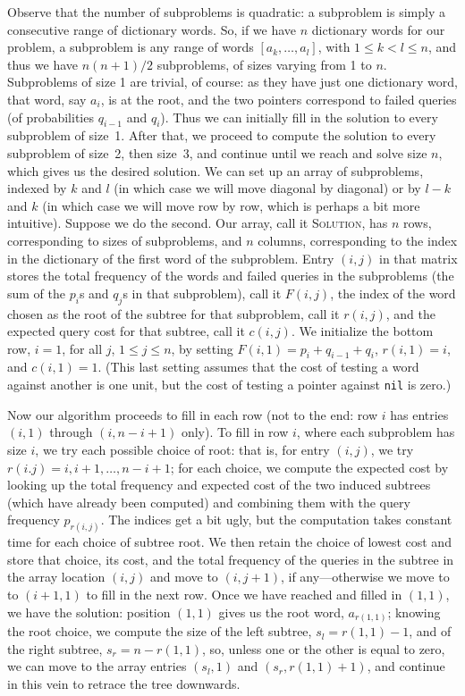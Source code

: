 \documentclass[11pt]{article}
\begin{document}
Observe that the number of subproblems is quadratic: a subproblem is simply
a consecutive range of dictionary words.  So, if we have $n$ dictionary
words for our problem, a subproblem is any range of words $[a_k,\ldots,a_l]$,
with $1\leq k<l\leq n$, and thus we have $n(n+1)/2$ subproblems, of sizes
varying from 1 to $n$.  Subproblems of size 1 are trivial, of course: as
they have just one dictionary word, that word, say $a_i$, is at the root,
and the two pointers correspond to failed queries (of probabilities
$q_{i-1}$ and $q_i$).  Thus we can initially fill in the solution to every
subproblem of size~1.  After that, we proceed to compute the solution to
every subproblem of size~2, then size~3, and continue until we reach and
solve size $n$, which gives us the desired solution.  We can set up an
array of subproblems, indexed by $k$ and $l$ (in which case we will move
diagonal by diagonal) or by $l-k$ and $k$ (in which case we will move row
by row, which is perhaps a bit more intuitive).  Suppose we do the second.
Our array, call it \textsc{Solution}, has $n$ rows, corresponding to
sizes of subproblems, and $n$ columns, corresponding to the index in the
dictionary of the first word of the subproblem.   Entry $(i,j)$ in that matrix
stores the total frequency of the words and failed queries in the subproblems
(the sum of the $p_i$s and $q_j$s in that subproblem), call it $F(i,j)$,
the index of the word chosen as the root of the subtree for that subproblem,
call it $r(i,j)$, and the expected query cost for that subtree, call it
$c(i,j)$.  We initialize the bottom row, $i=1$, for all $j$, $1\leq j\leq n$,
by setting $F(i,1)=p_i+q_{i-1}+q_{i}$, $r(i,1)=i$, and $c(i,1)=1$.
(This last setting assumes that the cost of testing a word against another
is one unit, but the cost of testing a pointer against \texttt{nil} is zero.)

Now our algorithm proceeds to fill in each row (not to the end: row $i$
has entries $(i,1)$ through $(i,n-i+1)$ only).  To fill in row $i$,
where each subproblem has size $i$, we try each possible choice of root:
that is, for entry $(i,j)$, we try $r(i.j)=i,i+1,\ldots,n-i+1$; for each
choice, we compute the expected cost by looking up the total frequency and
expected cost of the two induced subtrees (which have already been computed)
and combining them with the query frequency $p_{r(i,j)}$.  The indices get
a bit ugly, but the computation takes constant time for each choice of subtree
root.  We then retain the choice of lowest cost and store that choice, its
cost, and the total frequency of the queries in the subtree in the array
location $(i,j)$ and move to $(i,j+1)$, if any---otherwise we move to to
$(i+1,1)$ to fill in the next row.  Once we have reached and filled in
$(1,1)$, we have the solution: position $(1,1)$ gives us the root word,
$a_{r(1,1)}$; knowing the root choice, we compute the size of the left
subtree, $s_l=r(1,1)-1$, and of the right subtree, $s_r=n-r(1,1)$, so,
unless one or the other is equal to zero, we can move to the array entries
$(s_l,1)$ and $(s_r,r(1,1)+1)$, and continue in this vein to retrace the
tree downwards.
\end{document}
